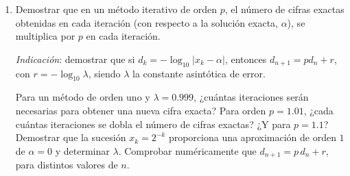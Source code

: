 \documentclass[11pt]{article}
\begin{document}

\begin{enumerate}
\item Demostrar que en un método iterativo de orden $p$, el número de
  cifras exactas obtenidas en cada iteración (con respecto a la
  solución exacta, $\alpha$), se multiplica por $p$ en cada iteración.
  \begin{flushright}
    \scriptsize \textit{Indicación}: demostrar que si
    $d_k=-\log_{10}|x_k-\alpha|$, entonces $d_{n+1}=p d_n + r$, con
    $r=-\log_{10}\lambda$, siendo $\lambda$ la constante asintótica de error.
  \end{flushright}
  Para un método de orden uno y $\lambda=0.999$, ¿cuántas iteraciones
  serán necesarias para obtener una nueva cifra exacta? Para orden
  $p=1.01$, ¿cada cuántas iteraciones se dobla el número de cifras
  exactas? ¿Y para $p=1.1$? Demostrar que la sucesión $x_k=2^{-k}$
  proporciona una aproximación de orden $1$ de $\alpha=0$ y determinar
  $\lambda$. Comprobar numéricamente que $d_{n+1}=p\, d_n + r$, para
  distintos valores de $n$.
\end{enumerate}
\end{document}
